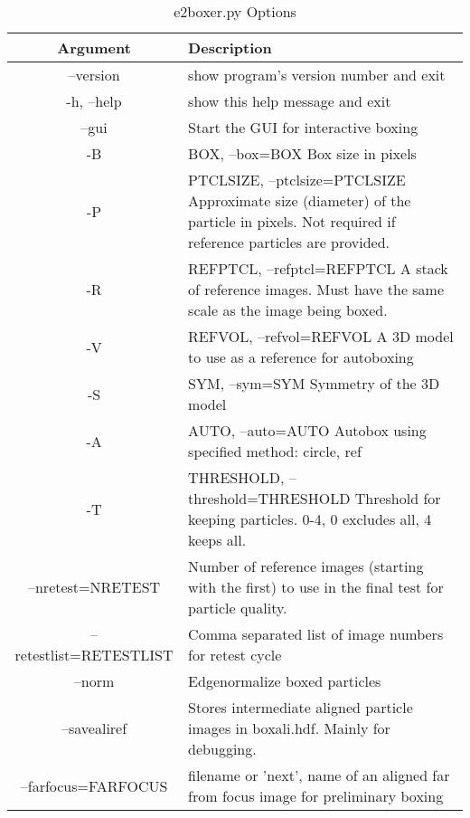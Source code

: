 \begin{longtable}{|c||p{3.5in}|}
\hline \bf{Argument} & \bf{Description}\endhead
\hline \multicolumn{2}{r}{{Continued on next page}} \endfoot
\hline \hline \caption[e2boxer.py Options]{e2boxer.py Options}\endlastfoot
\\\hline   --version  &  show program's version number and exit
\\\hline   -h, --help  &  show this help message and exit
\\\hline   --gui  &  Start the GUI for interactive boxing
\\\hline   -B  &  BOX, --box=BOX Box size in pixels
\\\hline   -P  &  PTCLSIZE, --ptclsize=PTCLSIZE Approximate size (diameter) of the particle in pixels. Not required if reference particles are provided.
\\\hline   -R  &  REFPTCL, --refptcl=REFPTCL A stack of reference images. Must have the same scale as the image being boxed.
\\\hline   -V  &  REFVOL, --refvol=REFVOL A 3D model to use as a reference for autoboxing
\\\hline   -S  &  SYM, --sym=SYM Symmetry of the 3D model
\\\hline   -A  &  AUTO, --auto=AUTO Autobox using specified method: circle, ref
\\\hline   -T  &  THRESHOLD, --threshold=THRESHOLD Threshold for keeping particles. 0-4, 0 excludes all, 4 keeps all.
\\\hline   --nretest=NRETEST  &  Number of reference images (starting with the first) to use in the final test for particle quality.
\\\hline   --retestlist=RETESTLIST  &  Comma separated list of image numbers for retest cycle
\\\hline   --norm  &  Edgenormalize boxed particles
\\\hline   --savealiref  &  Stores intermediate aligned particle images in boxali.hdf. Mainly for debugging.
\\\hline
 --farfocus=FARFOCUS  &  filename or 'next', name of an aligned far from focus image for preliminary boxing
\\\hline
\end{longtable}
